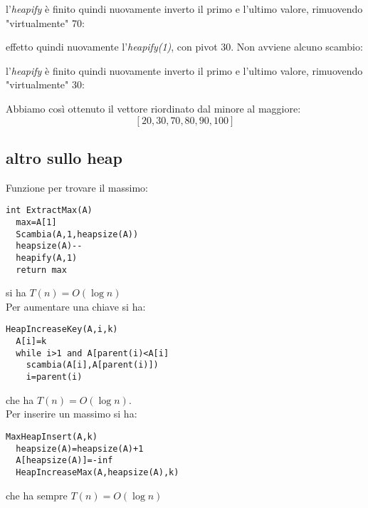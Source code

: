 \documentclass[a4paper,12pt,oneside,tikz]{book}
\begin{document}
l'\textit{heapify} è finito quindi nuovamente inverto il primo e l'ultimo valore, rimuovendo "virtualmente" 70:
\begin{center}
\end{center}
effetto quindi nuovamente l'\textit{heapify(1)}, con pivot 30. Non avviene alcuno scambio:
\begin{center}
\end{center}
l'\textit{heapify} è finito quindi nuovamente inverto il primo e l'ultimo valore, rimuovendo "virtualmente" 30:
\begin{center}
\end{center}
Abbiamo così ottenuto il vettore riordinato dal minore al maggiore:
$$[20,30,70,80,90,100]$$
\subsection{altro sullo heap}
Funzione per trovare il massimo:
\begin{verbatim}
int ExtractMax(A)
  max=A[1]
  Scambia(A,1,heapsize(A))
  heapsize(A)--
  heapify(A,1)
  return max
\end{verbatim}
si ha $T(n)=O(\log n)$\\
Per aumentare una chiave si ha:
\begin{verbatim}
HeapIncreaseKey(A,i,k)
  A[i]=k
  while i>1 and A[parent(i)<A[i]
    scambia(A[i],A[parent(i)])
    i=parent(i)
\end{verbatim}
che ha $T(n)=O(\log n)$.\\
Per inserire un massimo si ha:
\begin{verbatim}
MaxHeapInsert(A,k)
  heapsize(A)=heapsize(A)+1
  A[heapsize(A)]=-inf
  HeapIncreaseMax(A,heapsize(A),k)
\end{verbatim}
che ha sempre $T(n)=O(\log n)$
\end{document}

